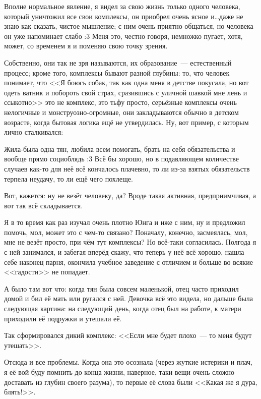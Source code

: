 \documentclass[a4paper,14pt,oneside]{memoir}
\begin{document}
\medskip

Вполне нормальное явление, я видел за свою жизнь только одного человека, который уничтожил все свои комплексы, он приобрел очень ясное и\ldots даже не знаю как сказать, чистое мышление; с ним очень приятно общаться, но человека он уже напоминает слабо :3 Меня это, честно говоря, немножко пугает, хотя, может, со временем я и поменяю свою точку зрения. 

Собственно, они так не зря называются, их образование~--- естественный процесс; кроме того, комплексы бывают разной глубины: то, что человек понимает, что <<Я боюсь собак, так как одна меня в детстве покусала, но вот одеть ватник и побороть свой страх, сразившись с уличной шавкой мне лень и ссыкотно>> это не комплекс, это тьфу просто, серьёзные комплексы очень нелогичные и монструозно-огромные, они закладываются обычно в детском возрасте, когда бытовая логика ещё не утвердилась. Ну, вот пример, с которым лично сталкивался:

Жила-была одна тян, любила всем помогать, брать на себя обязательства и вообще прямо социоблядь :3 Всё бы хорошо, но в подавляющем количестве случаев как-то для неё всё кончалось плачевно, то ли из-за взятых обязательств терпела неудачу, то ли ещё чего похлеще.

Вот, кажется: ну не везёт человеку, да? Вроде такая активная, предприимчивая, а вот так всё складывается.
 
Я в то время как раз изучал очень плотно Юнга и иже с ним, ну и предложил помочь, мол, может это с чем-то связано? Поначалу, конечно, засмеялась, мол, мне не везёт просто, при чём тут комплексы? Но всё-таки согласилась. Полгода я с ней занимался, и забегая вперёд скажу, что теперь у неё всё хорошо, нашла себе наконец парня, окончила учебное заведение с отличием и больше во всякие <<гадости>> не попадает. 

А было там вот что: когда тян была совсем маленькой, отец часто приходил домой и бил её мать или ругался с ней. Девочка всё это видела, но дальше была следующая картина: на следующий день, когда отец был на работе, к матери приходили её подружки и утешали её.
 
Так сформировался дикий комплекс: <<Если мне будет плохо~--- то меня будут утешать>>.
 
Отсюда и все проблемы. Когда она это осознала (через жуткие истерики и плач, я её вой буду помнить до конца жизни, наверное, таки вещи очень сложно доставать из глубин своего разума), то первые её слова были <<Какая же я дура, блять!>>.
 
\end{document}
